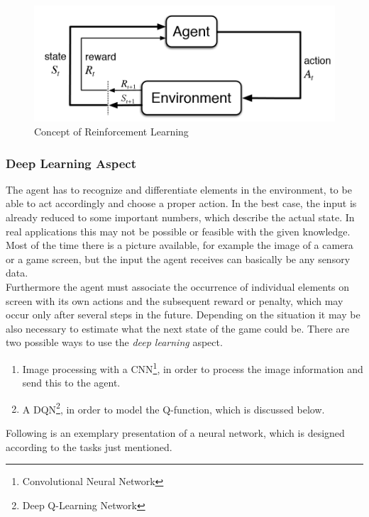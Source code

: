		\begin{figure}[h!]
			\begin{center}
				\includegraphics[width=0.7\linewidth]{img/eoeSq.png}
				\caption{Concept of Reinforcement Learning}
				\label{concept}
			\end{center}
		\end{figure}

	\subsubsection{Deep Learning Aspect}
		The agent has to recognize and differentiate elements in the environment, to be able to act accordingly and choose a proper action.
		In the best case, the input is already reduced to some important numbers, which describe the actual state.
		In real applications this may not be possible or feasible with the given knowledge.
		Most of the time there is a picture available, for example the image of a camera or a game screen, but the input the agent receives can basically be any sensory data.\\
		Furthermore the agent must associate the occurrence of individual elements on screen with its own actions and the subsequent reward or penalty, which may occur only after several steps in the future.
		Depending on the situation it may be also necessary to estimate what the next state of the game could be.
		There are two possible ways to use the \textit{deep learning} aspect.\\	
		\begin{enumerate}
			\item Image processing with a CNN\footnote{Convolutional Neural Network}, in order to process the image information and send this to the agent.
			\item A DQN\footnote{Deep Q-Learning Network}, in order to model the Q-function, which is discussed below.
		\end{enumerate}
		Following is an exemplary presentation of a neural network, which is designed according to the tasks just mentioned.
